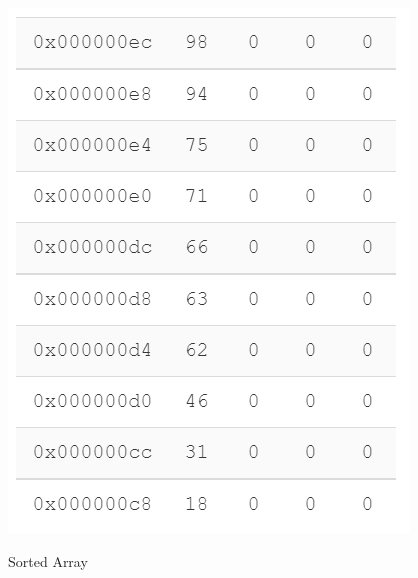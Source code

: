 \documentclass[12pt]{article}
\begin{document}
\begin{figure}[H]
    \centering
    \includegraphics[scale = 1]{../images/Sorted Array.png}
    \label{img2}
    \caption{Sorted Array}
\end{figure}
\end{document}
